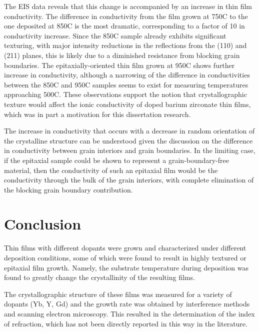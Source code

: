 The EIS data reveals that this change is accompanied by an increase in thin film conductivity. The difference in conductivity from the film grown at 750\textdegree C to the one deposited at 850\textdegree C is the most dramatic, corresponding to a factor of 10 in conductivity increase. Since the 850\textdegree C sample already exhibits significant texturing, with major intensity reductions in the reflections from the (110) and (211) planes, this is likely due to a diminished resistance from blocking grain boundaries. The epitaxially-oriented thin film grown at 950\textdegree C shows further increase in conductivity, although a narrowing of the difference in conductivities between the 850\textdegree C and 950\textdegree C samples seems to exist for measuring temperatures approaching 500\textdegree C. These observations support the notion that crystallographic texture would affect the ionic conductivity of doped barium zirconate thin films, which was in part a motivation for this dissertation research.

The increase in conductivity that occurs with a decrease in random orientation of the crystalline structure can be understood given the discussion on the difference in conductivity between grain interiors and grain boundaries. In the limiting case, if the epitaxial sample could be shown to represent a grain-boundary-free material, then the conductivity of such an epitaxial film would be the conductivity through the bulk of the grain interiors, with complete elimination of the blocking grain boundary contribution.

\vspace{12pt}
\section{Conclusion}
Thin films with different dopants were grown and characterized under different deposition conditions, some of which were found to result in highly textured or epitaxial film growth. Namely, the substrate temperature during deposition was found to greatly change the crystallinity of the resulting films. 

The crystallographic structure of these films was measured for a variety of dopants (Yb, Y, Gd) and the growth rate was obtained by interference methods and scanning electron microscopy. This resulted in the determination of the index of refraction, which has not been directly reported in this way in the literature.

